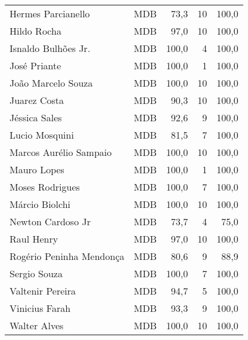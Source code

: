 \begin{longtable}{llrrr}
                  Hermes Parcianello &            MDB &      73,3 &           10 &      100,0 \\
                         Hildo Rocha &            MDB &      97,0 &           10 &      100,0 \\
                 Isnaldo Bulhões Jr. &            MDB &     100,0 &            4 &      100,0 \\
                        José Priante &            MDB &     100,0 &            1 &      100,0 \\
                  João Marcelo Souza &            MDB &     100,0 &           10 &      100,0 \\
                        Juarez Costa &            MDB &      90,3 &           10 &      100,0 \\
                       Jéssica Sales &            MDB &      92,6 &            9 &      100,0 \\
                      Lucio Mosquini &            MDB &      81,5 &            7 &      100,0 \\
              Marcos Aurélio Sampaio &            MDB &     100,0 &           10 &      100,0 \\
                         Mauro Lopes &            MDB &     100,0 &            1 &      100,0 \\
                     Moses Rodrigues &            MDB &     100,0 &            7 &      100,0 \\
                      Márcio Biolchi &            MDB &     100,0 &           10 &      100,0 \\
                   Newton Cardoso Jr &            MDB &      73,7 &            4 &       75,0 \\
                          Raul Henry &            MDB &      97,0 &           10 &      100,0 \\
            Rogério Peninha Mendonça &            MDB &      80,6 &            9 &       88,9 \\
                        Sergio Souza &            MDB &     100,0 &            7 &      100,0 \\
                    Valtenir Pereira &            MDB &      94,7 &            5 &      100,0 \\
                      Vinicius Farah &            MDB &      93,3 &            9 &      100,0 \\
                        Walter Alves &            MDB &     100,0 &           10 &      100,0 \\

\end{longtable}
